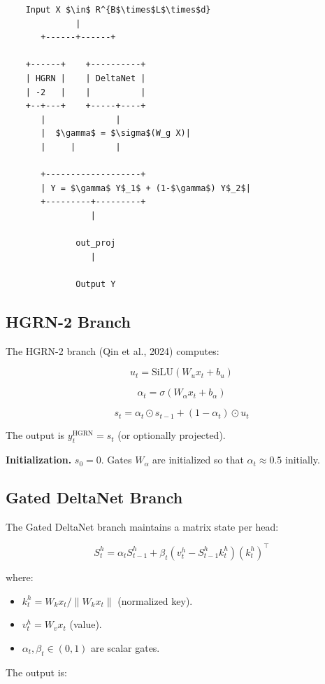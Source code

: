 \begin{lstlisting}
    Input X $\in$ R^{B$\times$L$\times$d}
              |
       +------+------+
                      
    +------+    +----------+
    | HGRN |    | DeltaNet |
    | -2   |    |          |
    +--+---+    +-----+----+
       |              |
       |  $\gamma$ = $\sigma$(W_g X)|
       |     |        |
                       
       +-------------------+
       | Y = $\gamma$ Y$_1$ + (1-$\gamma$) Y$_2$|
       +---------+---------+
                 |
                  
              out_proj
                 |
                  
              Output Y
\end{lstlisting}

\subsection{HGRN-2 Branch}

The HGRN-2 branch (Qin et al., 2024) computes:

\[
u_t = \text{SiLU}(W_u x_t + b_u)
\tag{4.1}
\]

\[
\alpha_t = \sigma(W_\alpha x_t + b_\alpha)
\tag{4.2}
\]

\[
s_t = \alpha_t \odot s_{t-1} + (1 - \alpha_t) \odot u_t
\tag{4.3}
\]

The output is $y_t^\text{HGRN} = s_t$ (or optionally projected).

\textbf{Initialization.} $s_0 = 0$. Gates $W_\alpha$ are initialized so that 
$\alpha_t \approx 0.5$ initially.

\subsection{Gated DeltaNet Branch}

The Gated DeltaNet branch maintains a matrix state per head:

\[
S_t^h = \alpha_t S_{t-1}^h + \beta_t (v_t^h - S_{t-1}^h k_t^h) (k_t^h)^\top
\tag{4.4}
\]

where:

\begin{itemize}
\item $k_t^h = W_k x_t / \|W_k x_t\|$ (normalized key).
\item $v_t^h = W_v x_t$ (value).
\item $\alpha_t, \beta_t \in (0, 1)$ are scalar gates.

\end{itemize}
The output is:

